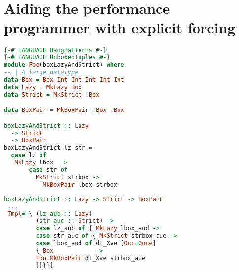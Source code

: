 \documentclass[sigplan,\review anonymous]{acmart}
\newcommand{\GHC}{\texttt{GHC} }
\newcommand{\ghc}{\GHC}
\newcommand{\core}{\texttt{Core} }
\begin{document}
\section{Aiding the performance programmer with explicit forcing}

\begin{lstlisting}[language=haskell, caption=Haskell program with two datatypes  \texttt{Lazy} and \texttt{Strict}
with the same shape of data but different strictness annotations.]
{-# LANGUAGE BangPatterns #-}
{-# LANGUAGE UnboxedTuples #-}
module Foo(boxLazyAndStrict) where
-- | A large datatype
data Box = Box Int Int Int Int Int
data Lazy = MkLazy Box
data Strict = MkStrict !Box

data BoxPair = MkBoxPair !Box !Box

boxLazyAndStrict :: Lazy 
  -> Strict 
  -> BoxPair
boxLazyAndStrict lz str =
  case lz of
   MkLazy lbox  ->
       case str of
         MkStrict strbox ->
           MkBoxPair lbox strbox
\end{lstlisting}


\begin{lstlisting}[language=haskell,caption=\ghc \core corresponding to the  above Haskell program  where there is no indication
         that \texttt{strbox} is a value while \texttt{lbox} is a thunk]
boxLazyAndStrict :: Lazy -> Strict -> BoxPair
 ...
 Tmpl= \ (lz_aub :: Lazy)
         (str_auc :: Strict) ->
         case lz_aub of { MkLazy lbox_aud ->
         case str_auc of { MkStrict strbox_aue ->
         case lbox_aud of dt_Xve [Occ=Once]
         { Box _ _ _ _ _  ->
         Foo.MkBoxPair dt_Xve strbox_aue
         }}}}]
\end{lstlisting}
\end{document}
